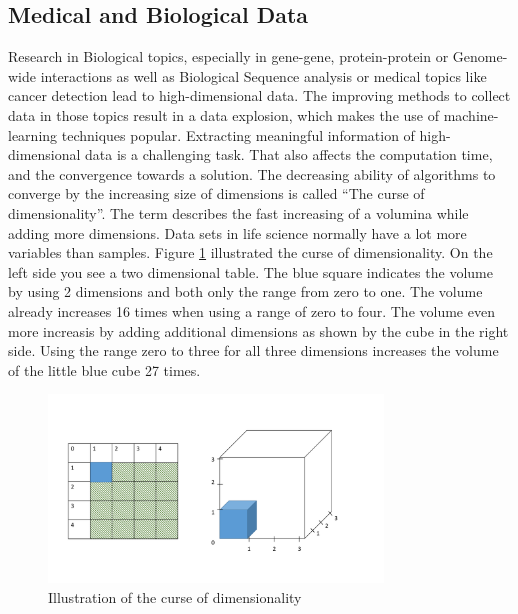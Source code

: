 \documentclass{sig-alternate-05-2015}
\begin{document}
\subsection{Medical and Biological Data}
Research in Biological topics, especially in gene-gene, protein-protein or Genome-wide interactions as well as Biological Sequence analysis or medical topics like cancer detection lead to high-dimensional data. The improving methods to collect data in those topics result in a data explosion, which makes the use of machine-learning techniques popular. Extracting meaningful information of high-dimensional data is a challenging task. That also affects the computation time, and the convergence towards a solution. The decreasing ability of algorithms to converge by the increasing size of dimensions is called ``The curse of dimensionality''.
The term  describes the fast increasing of a volumina while adding more dimensions. Data sets in life science normally have a lot more variables than samples. Figure \ref{fig:curse_dim} illustrated the curse of dimensionality. On the left side you see a two dimensional table. The blue square indicates the volume by using 2 dimensions and both only the range from zero to one. The volume already increases 16 times when using a range of zero to four. The volume even more increasis by adding additional dimensions as shown by the cube in the right side. Using the range zero to three for all three dimensions increases the volume of the  little blue cube 27 times.

\begin{figure}
\centering
\includegraphics[width=3.5in]{curse_dim}
\caption{Illustration of the curse of dimensionality}
\label{fig:curse_dim}
\end{figure}
\end{document}
